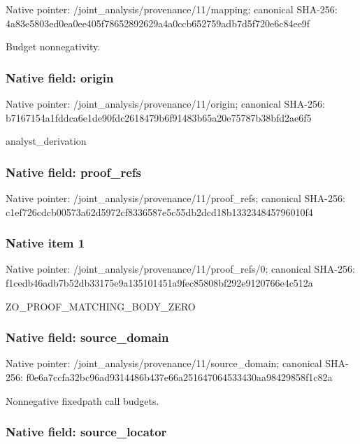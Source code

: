 \documentclass[10pt,a4paper]{article}
\begin{document}
Native pointer: /joint\_analysis/provenance/11/mapping; canonical SHA-256: 4a83e5803ed0ea0ee405f786\allowbreak{}52892629a4a0ccb652759adb\allowbreak{}7d5f720e6c84ee9f


Budget nonnegativity.


\subsubsection{Native field: origin}


Native pointer: /joint\_analysis/provenance/11/origin; canonical SHA-256: b7167154a1fddca6e1de90fd\allowbreak{}c2618479b6f91483b65a20e7\allowbreak{}5787b38bfd2ae6f5


analyst\_derivation


\subsubsection{Native field: proof\_refs}


Native pointer: /joint\_analysis/provenan\allowbreak{}ce/11/proof\_refs; canonical SHA-256: c1ef726cdcb00573a62d5972\allowbreak{}cf8336587e5c55db2dcd18b1\allowbreak{}33234845796010f4



\subsubsection{Native item 1}


Native pointer: /joint\_analysis/provenan\allowbreak{}ce/11/proof\_refs/0; canonical SHA-256: f1cedb46adb7b52db33175e9\allowbreak{}a135101451a9fec85808bf29\allowbreak{}2e9120766e4c512a


ZO\_PROOF\_MATCHING\_BODY\_ZERO


\subsubsection{Native field: source\_domain}


Native pointer: /joint\_analysis/provenan\allowbreak{}ce/11/source\_domain; canonical SHA-256: f0e6a7ccfa32bc96ad931448\allowbreak{}6b437e66a251647064533430\allowbreak{}aa98429858f1c82a


Nonnegative fixedpath call budgets.


\subsubsection{Native field: source\_locator}
\end{document}
